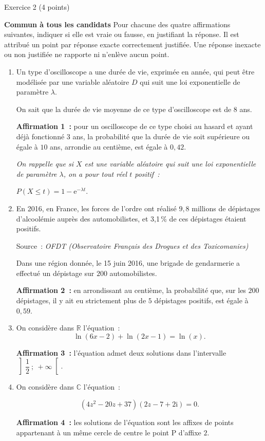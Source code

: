 
\begin{h2}Exercice 2 (4 points)\end{h2}
\textbf{Commun à  tous les candidats}
\medbreak
Pour chacune des quatre affirmations suivantes, indiquer si elle est vraie ou fausse, en justifiant la
réponse. Il est attribué un point par réponse exacte correctement justifiée. Une réponse inexacte ou
non justifiée ne rapporte ni n'enlève aucun point.
\par
\begin{enumerate}
     \item Un type d'oscilloscope a une durée de vie, exprimée en année, qui peut être modélisée par une
     variable aléatoire $D$ qui suit une loi exponentielle de paramètre $\lambda$.
     \par
     On sait que la durée de vie moyenne de ce type d'oscilloscope est de $8$ ans.
     \par
     \textbf{Affirmation 1~:} pour un oscilloscope de ce type choisi au hasard et ayant déjà fonctionné $3$ ans,
     la probabilité que la durée de vie soit supérieure ou égale à $10$ ans, arrondie au centième, est
     égale à $0,42$.
     \par
     \emph{On rappelle que si $X$ est une variable aléatoire qui suit une loi exponentielle de paramètre $\lambda$, on a pour tout réel $t$ positif~:}
     \begin{center}
          $P(X \leqslant t) = 1 - \text{e}^{-\lambda t}$.
     \end{center}
     \item  En 2016, en France, les forces de l'ordre ont réalisé $9,8$ millions de dépistages d'alcoolémie
     auprès des automobilistes, et 3,1\,\% de ces dépistages étaient positifs.
     \par
     Source~: \emph{OFDT (Observatoire Français des Drogues et des Toxicomanies)}
     \par
     Dans une région donnée, le 15 juin 2016, une brigade de gendarmerie a effectué un dépistage
     sur $200$ automobilistes.
     \par
     \textbf{Affirmation 2~:} en arrondissant au centième, la probabilité que, sur les $200$ dépistages, il y ait
     eu strictement plus de $5$ dépistages positifs, est égale à $0,59$.
     \item  On considère dans $\mathbb{R}$ l'équation~:
     \[\ln (6 x - 2) + \ln (2x - 1) = \ln (x).\]
     \par
     \textbf{Affirmation 3~:} l'équation admet deux solutions dans l'intervalle $\left]\dfrac{1}{2}~;~+ \infty\right[$.
     \item  On considère dans $\mathbb{C}$ l'équation~:
     \par
     \[\left(4z^2 - 20z + 37\right)(2z -7 + 2\text{i}) = 0.\]
     \par
     \textbf{Affirmation 4~:} les solutions de l'équation sont les affixes de points appartenant à un même
     cercle de centre le point P d'affixe $2$.
\end{enumerate}
